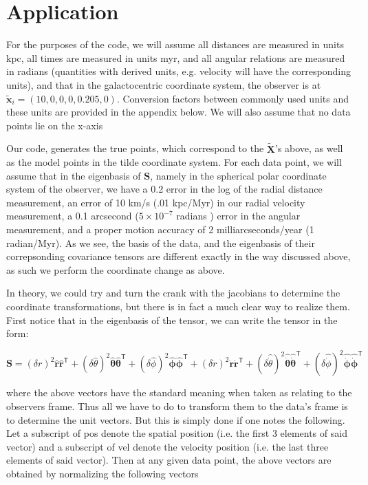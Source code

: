 \documentclass[12pt,preprint]{aastex}
\newcommand{\mtensor}[1]{\boldsymbol{#1}}
\newcommand{\mS}{\mtensor{S}}
\newcommand{\mvector}[1]{\mtensor{#1}}
\newcommand{\vx}{\mvector{x}}
\newcommand{\vX}{\mvector{X}}
\newcommand{\transpose}[1]{{#1}^{\textsf{T}}}
\begin{document}
\section{Application}
For the purposes of the code, we will assume all distances are measured in units kpc, all times are measured in units myr, and all angular relations are measured in radians (quantities with derived units, e.g. velocity will have the corresponding units), and that in the galactocentric coordinate system, the observer is at  $\tilde{\vx}_i = (10,0,0,0,0.205,0)$. Conversion factors between commonly used units and these units are provided in the appendix below. We will also assume that no data points lie on the x-axis

Our code, generates the true points, which correspond to the $\tilde{\vX}$'s above,  as well as the model points in the tilde coordinate system.  For each data point, we will assume that in the eigenbasis of $\mS$, namely in the spherical polar coordinate system of the observer, we have a 0.2 error in the log of the radial distance measurement, an error of 10 km/s (.01 kpc/Myr) in our radial velocity measurement, a 0.1 arcsecond  ($5 \times 10^{-7}$ radians ) error in the angular measurement,  and a proper motion accuracy of 2 milliarcseconds/year (1 radian/Myr).  As we see, the basis of the data, and the eigenbasis of their correpsonding covariance tensors are different exactly in the way discussed above, as such we perform the coordinate change as above.

In theory, we could try and turn the crank with the jacobians to determine the coordinate transformations, but there is in fact a much clear way to realize them. First notice that in the eigenbasis of the tensor, we can write the tensor in the form:

\begin{equation}\label{firstattempt}
\mS = (\delta r)^2 \mtensor{\hat{r}}\transpose{\mtensor{\hat{r}}} 
+ (\delta \hat{\theta} )^2 \mtensor{\hat{\theta}}\transpose{\mtensor{\hat{\theta}}} 
+ (\delta \hat{\phi})^2 \mtensor{\hat{\phi}}\transpose{\mtensor{\hat{\phi}}}
+(\delta \dot{r})^2 \mtensor{\dot{r}}\transpose{\mtensor{\dot{r}}} 
+(\delta \hat{\dot{\theta}})^2 \mtensor{ \hat{\dot{\theta}}}\transpose{\mtensor{ \hat{\dot{\theta}}}} 
+  (\delta\hat{\dot{\phi}})^2 \mtensor{\hat{\dot{\phi}}}\transpose{\mtensor{\hat{\dot{\phi}}}}
\end{equation}

where the above vectors have the standard meaning when taken as relating to the observers frame. Thus all we have to do to transform them to the data's frame is to determine the unit vectors. But this is simply done if one notes the following. Let a subscript of pos denote the spatial position (i.e. the first 3 elements of said vector) and a subscript of vel denote the velocity position (i.e. the last three elements of said vector). Then at any given data point, the above vectors are obtained by normalizing the following vectors
\end{document}
